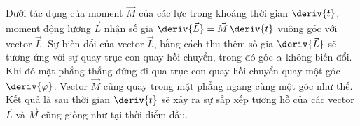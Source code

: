 
Dưới tác dụng của moment $\vec{M}$ của các lực trong khoảng thời gian $\deriv{t}$, moment động lượng $\vec{L}$ nhận số gia $\deriv{\vec{L}}=\vec{M}\,\deriv{t}$ vuông góc với vector $\vec{L}$. Sự biến đổi của vector $\vec{L}$, bằng cách thu thêm số gia $\deriv{\vec{L}}$ sẽ tương ứng với sự quay trục con quay hồi chuyển, trong đó góc $\alpha$ không biến đổi. Khi đó mặt phẳng thẳng đứng đi qua trục con quay hồi chuyển quay một góc $\deriv{\varphi}$. Vector $\vec{M}$ cũng quay trong mặt phẳng ngang cùng một góc như thế. Kết quả là sau thời gian $\deriv{t}$ sẽ xảy ra sự sắp xếp tương hỗ của các vector $\vec{L}$ và $\vec{M}$ cũng giống như tại thời điểm đầu.


